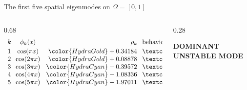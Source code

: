 \begin{frame}{The first five spatial eigenmodes on $\Omega=[0,1]$}
\begin{columns}[c,onlytextwidth]
    \begin{column}{0.68\textwidth}
      {\color{HydraWhite}\fontsize{7.2}{9.0}\selectfont
      \begin{align*}
        \begin{array}{c@{\hspace{0.25cm}}c@{\hspace{0.32cm}}r@{\hspace{0.28cm}}l}
          k
          &
          \phi_k(x)
          &
          \rho_k
          &
          \text{behavior}
          \\[0.08cm]
          1
          &
          \cos(\pi x)
          &
          {\color{HydraGold}+0.34184}
          &
          \textcolor{HydraGold}{\text{unstable}}
          \\
          2
          &
          \cos(2\pi x)
          &
          {\color{HydraGold}+0.08878}
          &
          \textcolor{HydraGold}{\text{unstable}}
          \\
          3
          &
          \cos(3\pi x)
          &
          {\color{HydraCyan}-0.39572}
          &
          \textcolor{HydraCyan}{\text{stable}}
          \\
          4
          &
          \cos(4\pi x)
          &
          {\color{HydraCyan}-1.08336}
          &
          \textcolor{HydraCyan}{\text{stable}}
          \\
          5
          &
          \cos(5\pi x)
          &
          {\color{HydraCyan}-1.97011}
          &
          \textcolor{HydraCyan}{\text{stable}}
        \end{array}
      \end{align*}
      }
    \end{column}

    \begin{column}{0.28\textwidth}
      \centering

      {\color{HydraGold}\bfseries\fontsize{7.2}{8.8}\selectfont
        DOMINANT UNSTABLE MODE\par}

      \vspace{0.08cm}

\end{column}
\end{columns}
\end{frame}
